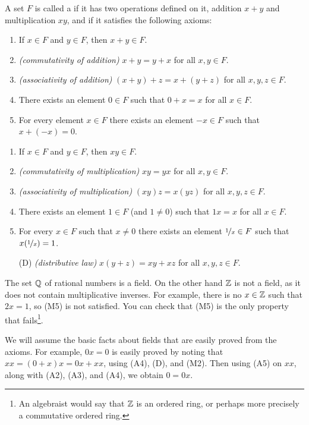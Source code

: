 \begin{defn}
A set $F$ is called a \emph{} if it has two operations
defined on it, addition $x+y$ and multiplication $xy$, and if it satisfies
the following axioms:
\begin{enumerate}[({A}1)]
\item If $x \in F$ and $y \in F$, then $x+y \in F$.
\item \emph{(commutativity of addition)}
$x+y = y+x$ for all $x,y \in F$.
\item \emph{(associativity of addition)}
$(x+y)+z = x+(y+z)$ for all $x,y,z \in F$.
\item There exists an element $0 \in F$ such that
$0+x = x$ for all $x \in F$.
\item For every element $x\in F$ there exists an element $-x \in F$
such that $x + (-x) = 0$.
\end{enumerate}
\begin{enumerate}[({M}1)]
\item If $x \in F$ and $y \in F$, then $xy \in F$.
\item \emph{(commutativity of multiplication)}
$xy = yx$ for all $x,y \in F$.
\item \emph{(associativity of multiplication)}
$(xy)z = x(yz)$ for all $x,y,z \in F$.
\item There exists an element $1 \in F$ (and $1 \not= 0$) such that
$1x = x$ for all $x \in F$.
\item For every $x\in F$ such that $x \not= 0$ there exists an element
$\nicefrac{1}{x} \in F$
such that $x(\nicefrac{1}{x}) = 1$.
\item[(D)] \emph{(distributive law)} $x(y+z) = xy+xz$
for all $x,y,z \in F$.
\end{enumerate}
\end{defn}

\begin{example}
The set ${\mathbb{Q}}$ of rational numbers is a field.  On the other hand ${\mathbb{Z}}$ is not a
field, as it does not contain multiplicative inverses.  For example,
there is no $x \in {\mathbb{Z}}$ such that $2x = 1$, so (M5) is not satisfied.  You
can check that (M5) is the only property that fails\footnote{An algebraist would say that ${\mathbb{Z}}$ is an ordered
ring, or perhaps more precisely a commutative ordered ring.}.
\end{example}

We will assume the basic facts about fields that are easily 
proved from the axioms.  For example, $0x = 0$ is easily proved
by noting that $xx = (0+x)x = 0x+xx$, using (A4), (D)\@, and (M2).  Then
using (A5) on $xx$, along with (A2), (A3), and (A4), we obtain $0 = 0x$.

